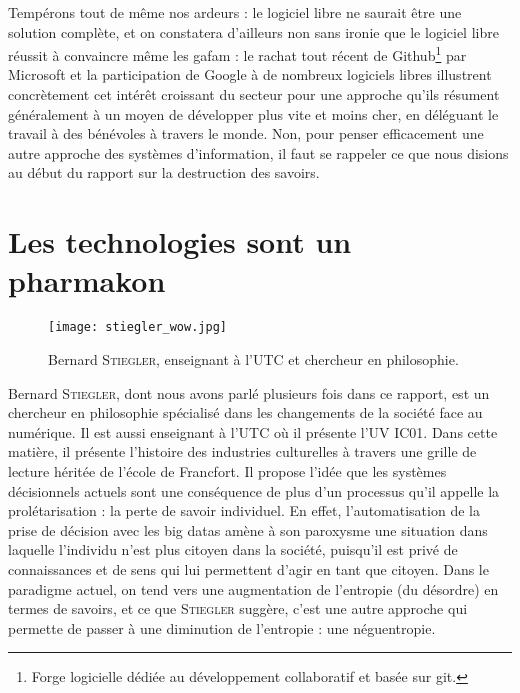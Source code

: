 \documentclass[a4paper,14pt]{extreport}
\begin{document}
Tempérons tout de même nos ardeurs : le logiciel libre ne saurait être une solution complète, et on constatera d'ailleurs non sans ironie que le logiciel libre réussit à convaincre même les \gls{gafam} : le rachat tout récent de Github\footnote{Forge logicielle dédiée au développement collaboratif et basée sur git.} par Microsoft et la participation de Google à de nombreux logiciels libres illustrent concrètement cet intérêt croissant du secteur pour une approche qu'ils résument généralement à un moyen de développer plus vite et moins cher, en déléguant le travail à des bénévoles à travers le monde. Non, pour penser efficacement une autre approche des systèmes d'information, il faut se rappeler ce que nous disions au début du rapport sur la destruction des savoirs.

\section{Les technologies sont un pharmakon}

\begin{figure}[ht]
 \begin{center}
  \texttt{[image: stiegler\_wow.jpg]}
 \end{center}
    \caption{Bernard \textsc{Stiegler}, enseignant à l'UTC et chercheur en philosophie.}
 \label{stieg}
\end{figure}

Bernard \textsc{Stiegler}, dont nous avons parlé plusieurs fois dans ce rapport, est un chercheur en philosophie spécialisé dans les changements de la société face au numérique. Il est aussi enseignant à l'UTC où il présente l'UV IC01. Dans cette matière, il présente l'histoire des industries culturelles à travers une grille de lecture héritée de l'école de Francfort. Il propose l'idée que les systèmes décisionnels actuels sont une conséquence de plus d'un processus qu'il appelle la prolétarisation : la perte de savoir individuel. En effet, l'automatisation de la prise de décision avec les big datas amène à son paroxysme une situation dans laquelle l'individu n'est plus citoyen dans la société, puisqu'il est privé de connaissances et de sens qui lui permettent d'agir en tant que citoyen. Dans le paradigme actuel, on tend vers une augmentation de l'entropie (du désordre) en termes de savoirs, et ce que \textsc{Stiegler} suggère, c'est une autre approche qui permette de passer à une diminution de l'entropie : une néguentropie.
\end{document}
